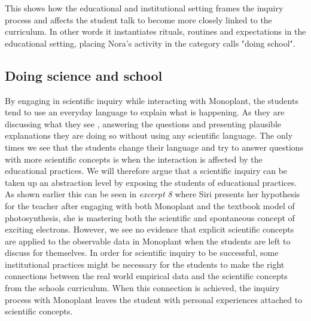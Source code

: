 This shows how the educational and institutional setting frames the inquiry process and affects the student talk to become more closely linked to the curriculum. In other words it instantiates rituals, routines and expectations in the educational setting, placing Nora's activity in the category \citet{jimenez2000doing} calls "doing school". 


\subsection{Doing science and school}
By engaging in scientific inquiry while interacting with Monoplant, the students tend to use an everyday language to explain what is happening. As they are discussing what they see , answering the questions and presenting plausible explanations they are doing so without using any scientific language. The only times we see that the students change their language and try to answer questions with more scientific concepts is when the interaction is affected by the educational practices. We will therefore argue that a scientific inquiry can be taken up an abstraction level by exposing the students of educational practices. As shown earlier this can be seen in \emph{excerpt 8} where Siri presents her hypothesis for the teacher after engaging with both Monoplant and the textbook model of photosynthesis, she is mastering both the scientific and spontaneous concept of exciting electrons. However, we see no evidence that explicit scientific concepts are applied to the observable data in Monoplant when the students are left to discuss for themselves. 
In order for scientific inquiry to be successful, some institutional practices might be necessary for the students to make the right connections between the real world empirical data and the scientific concepts from the schools curriculum. When this connection is achieved, the inquiry process with Monoplant leaves the student with personal experiences attached to scientific concepts. 

 



